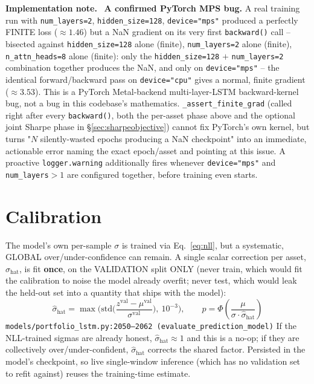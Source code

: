 \documentclass[11pt]{article}
\newcommand{\srcref}[1]{\hfill\textcolor{cmtcolor}{\footnotesize\texttt{#1}}}
\newcommand{\code}[1]{\texttt{\small #1}}
\newcommand{\fixnotelabel}{\small\textbf{Implementation note.}~}
\begin{document}
\begin{fixnote}\fixnotelabel
\textbf{A confirmed PyTorch MPS bug.} A real training run with \code{num\_layers=2},
\code{hidden\_size=128}, \code{device="mps"} produced a perfectly FINITE loss
($\approx 1.46$) but a NaN gradient on its very first \code{backward()} call -- bisected
against \code{hidden\_size=128} alone (finite), \code{num\_layers=2} alone (finite),
\code{n\_attn\_heads=8} alone (finite): only the \code{hidden\_size=128} $+$
\code{num\_layers=2} combination together produces the NaN, and only on \code{device="mps"}
-- the identical forward/backward pass on \code{device="cpu"} gives a normal, finite
gradient ($\approx 3.53$). This is a PyTorch Metal-backend multi-layer-LSTM backward-kernel
bug, not a bug in this codebase's mathematics. \code{\_assert\_finite\_grad} (called right
after every \code{backward()}, both the per-asset phase above and the optional joint Sharpe
phase in \S\ref{sec:sharpeobjective}) cannot fix PyTorch's own kernel, but turns
"$N$ silently-wasted epochs producing a NaN checkpoint" into an immediate, actionable error
naming the exact epoch/asset and pointing at this issue. A proactive \code{logger.warning}
additionally fires whenever \code{device="mps"} and \code{num\_layers}$>1$ are configured
together, before training even starts.
\end{fixnote}

\section{Calibration}
\label{sec:calibration}

The model's own per-sample $\sigma$ is trained via Eq.~\ref{eq:nll}, but a systematic,
GLOBAL over/under-confidence can remain. A single scalar correction per asset,
$\hat\sigma_{\text{hat}}$, is fit \textbf{once}, on the VALIDATION split ONLY (never train,
which would fit the calibration to noise the model already overfit; never test, which would
leak the held-out set into a quantity that ships with the model):
\begin{equation}
  \hat\sigma_{\text{hat}} = \max\!\Big(\mathrm{std}\Big(\frac{z^{\text{val}} - \mu^{\text{val}}}{\sigma^{\text{val}}}\Big),\ 10^{-3}\Big), \qquad
  p = \Phi\!\left(\frac{\mu}{\sigma \cdot \hat\sigma_{\text{hat}}}\right)
  \label{eq:sigmahat}
\end{equation}
\srcref{models/portfolio\_lstm.py:2050--2062 (\texttt{evaluate\_prediction\_model})}
If the NLL-trained sigmas are already honest, $\hat\sigma_{\text{hat}}\approx 1$ and this is
a no-op; if they are collectively over/under-confident, $\hat\sigma_{\text{hat}}$ corrects
the shared factor. Persisted in the model's checkpoint, so live single-window inference
(which has no validation set to refit against) reuses the training-time estimate.
\end{document}
